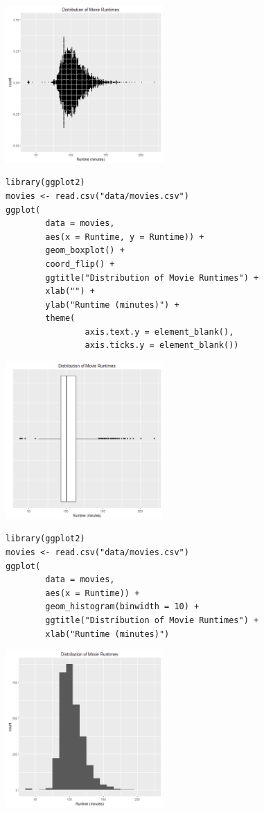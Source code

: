 \documentclass[a4paper, captions=tableheading]{tufte-book}
\begin{document}
\includegraphics[height=6cm]{img/1-num-ggplot2-01.png}


\begin{verbatim}
library(ggplot2)
movies <- read.csv("data/movies.csv")
ggplot(
		data = movies,
		aes(x = Runtime, y = Runtime)) +
		geom_boxplot() +
		coord_flip() +
		ggtitle("Distribution of Movie Runtimes") +
		xlab("") +
		ylab("Runtime (minutes)") +
		theme(
				axis.text.y = element_blank(),
				axis.ticks.y = element_blank())
\end{verbatim}

\includegraphics[height=6cm]{img/1-num-ggplot2-02.png}


\begin{verbatim}
library(ggplot2)
movies <- read.csv("data/movies.csv")
ggplot(
		data = movies,
		aes(x = Runtime)) +
		geom_histogram(binwidth = 10) +
		ggtitle("Distribution of Movie Runtimes") +
		xlab("Runtime (minutes)")
\end{verbatim}

\includegraphics[height=6cm]{img/1-num-ggplot2-03.png}
\end{document}
